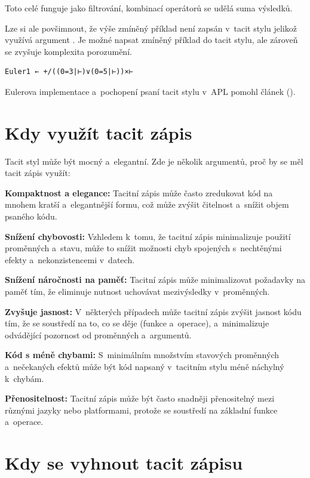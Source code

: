 \documentclass[male, czech]{kithesis}
\newcommand{\aplInline}[1]{\colorbox{gray!10}{{\apl{#1}}}}
\begin{document}
Toto celé funguje jako filtrování, 
kombinací operátorů \aplInline{+/} se udělá suma výsledků.

Lze si ale povšimnout, 
že výše zmíněný příklad není zapsán v~tacit stylu jelikož využívá argument \aplInline{⍵}.
Je možné napsat zmíněný příklad do tacit stylu, 
ale zároveň se zvyšuje komplexita porozumění.
\begin{lstlisting}[language=apl,extendedchars=true]
  Euler1 ← +/((0=3|⊢)∨(0=5|⊢))×⊢
\end{lstlisting}

Eulerova implementace a~pochopení psaní tacit stylu v~APL pomohl článek (\cite{CzechApl}).

\section{Kdy využít tacit zápis}

Tacit styl může být mocný a~elegantní.
Zde je několik argumentů, 
proč by se měl tacit zápis využít:

\textbf{Kompaktnost a elegance:}
Tacitní zápis může často zredukovat kód na mnohem kratší a~elegantnější formu, 
což může zvýšit čitelnost a~snížit objem psaného kódu.

\textbf{Snížení chybovosti:}
Vzhledem k~tomu, že tacitní zápis minimalizuje použití proměnných a~stavu, 
může to snížit možnosti chyb spojených s~nechtěnými efekty a~nekonzistencemi v~datech.

\textbf{Snížení náročnosti na paměť:}
Tacitní zápis může minimalizovat požadavky na paměť tím, 
že eliminuje nutnost uchovávat mezivýsledky v~proměnných.

\textbf{Zvyšuje jasnost:}
V~některých případech může tacitní zápis zvýšit jasnost kódu tím, 
že se soustředí na to, co se děje (funkce a~operace), 
a~minimalizuje odvádějící pozornost od proměnných a~argumentů.

\textbf{Kód s méně chybami:}
S~minimálním množstvím stavových proměnných
a~nečekaných efektů může být kód napsaný v~tacitním stylu méně náchylný k~chybám.

\textbf{Přenositelnost:}
Tacitní zápis může být často snadněji přenositelný mezi různými jazyky nebo platformami, 
protože se soustředí na základní funkce a~operace.


\section{Kdy se vyhnout tacit zápisu}
\end{document}
